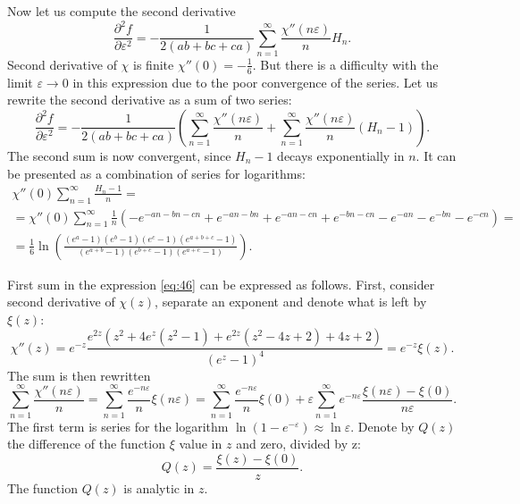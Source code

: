 \documentclass{article}
\begin{document}
Now let us compute the second derivative
\begin{equation}
  \label{eq:44}
\frac{\partial^{2} f}{\partial
  \varepsilon^{2}}=-\frac{1}{2(ab+bc+ca)} \sum _{n=1}^{\infty} \frac{\chi''(n\varepsilon)}{n} H_{n}.  
\end{equation}
Second derivative of $\chi$ is finite $\chi''(0)=-\frac{1}{6}$. But there is a difficulty with the
limit $\varepsilon\to 0$ in this expression due to the poor convergence of the series. Let us
rewrite the second derivative as a sum of two series:
\begin{equation}
  \label{eq:46}
\frac{\partial^{2} f}{\partial
  \varepsilon^{2}}=-\frac{1}{2(ab+bc+ca)} \left(\sum _{n=1}^{\infty} \frac{\chi''(n\varepsilon)}{n}+
  \sum_{n=1}^{\infty} \frac{\chi''(n\varepsilon)}{n}(H_{n}-1)\right).    
\end{equation}
The second sum is now convergent, since $H_{n}-1$ decays exponentially in $n$. It can be presented
as a combination of series for logarithms:
\begin{multline}
  \label{eq:47}
  \chi''(0)\sum_{n=1}^{\infty} \frac{H_{n}-1}{n}=\\=\chi''(0)\sum_{n=1}^{\infty}\frac{1}{n}\left(-e^{-a
      n-b n-c n}+e^{-a n-b n}+e^{-a n-c n}+e^{-b n-c n} - e^{-a n}-e^{-b n}-e^{-c n}\right)=\\
  =\frac{1}{6}\ln\left(\frac{(e^{a}-1)(e^{b}-1)(e^{c}-1)(e^{a+b+c}-1)}{(e^{a+b}-1)(e^{b+c}-1)(e^{a+c}-1)}\right).
\end{multline}

First sum in the expression \eqref{eq:46} can be expressed as follows. First, consider second
derivative of $\chi(z)$, separate an exponent and denote what is left by $\xi(z)$:
\begin{equation}
  \label{eq:48}
  \chi''(z)=e^{-z}\frac{e^{2 z} \left(z^2+4 e^z
   \left(z^2-1\right)+e^{2 z} \left(z^2-4
   z+2\right)+4
   z+2\right)}{\left(e^z-1\right)^4}=e^{-z}\xi(z).
\end{equation}
The sum is then rewritten
\begin{equation}
  \label{eq:49}
  \sum _{n=1}^{\infty} \frac{\chi''(n\varepsilon)}{n}=
  \sum_{n=1}^{\infty}\frac{e^{-n\varepsilon}}{n}\xi(n\varepsilon) =
  \sum_{n=1}^{\infty}\frac{e^{-n\varepsilon}}{n}\xi(0)+  \varepsilon\sum_{n=1}^{\infty}e^{-n\varepsilon}\frac{\xi(n\varepsilon)-\xi(0)}{n\varepsilon}.
\end{equation}
The first term is series for the logarithm $\ln\left(1-e^{-\varepsilon}\right)\approx \ln
\varepsilon$. 
Denote by $Q(z)$ the difference of the function $\xi$ value in $z$ and zero, divided by z:
\begin{equation}
  \label{eq:85}
  Q(z)=\frac{\xi(z)-\xi(0)}{z}.
\end{equation}
The function $Q(z)$ is analytic in $z$.
\end{document}
